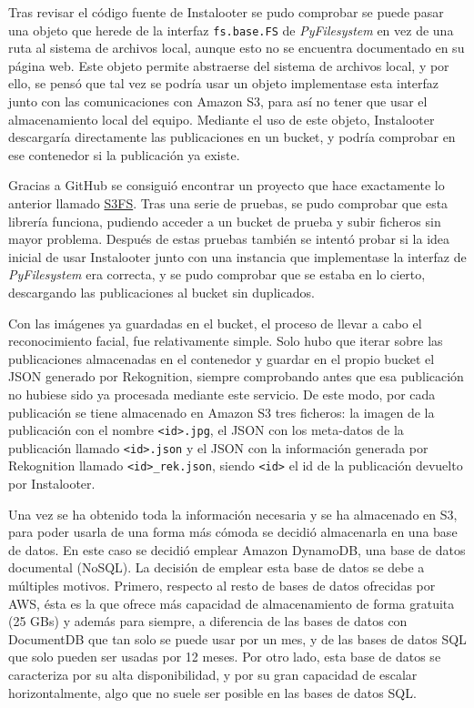 Tras revisar el código fuente de Instalooter se pudo comprobar se puede pasar una objeto que herede de la interfaz \texttt{fs.base.FS} de \textit{PyFilesystem} en vez de una ruta al sistema de archivos local, aunque esto no se encuentra documentado en su página web. Este objeto permite abstraerse del sistema de archivos local, y por ello, se pensó que tal vez se podría usar un objeto implementase esta interfaz junto con las comunicaciones con Amazon S3, para así no tener que usar el almacenamiento local del equipo. Mediante el uso de este objeto, Instalooter descargaría directamente las publicaciones en un bucket, y podría comprobar en ese contenedor si la publicación ya existe.

Gracias a GitHub se consiguió encontrar un proyecto que hace exactamente lo anterior llamado \href{https://github.com/PyFilesystem/s3fs}{S3FS}. Tras una serie de pruebas, se pudo comprobar que esta librería funciona, pudiendo acceder a un bucket de prueba y subir ficheros sin mayor problema. Después de estas pruebas también se intentó probar si la idea inicial de usar Instalooter junto con una instancia que implementase la interfaz de \textit{PyFilesystem} era correcta, y se pudo comprobar que se estaba en lo cierto, descargando las publicaciones al bucket sin duplicados.

Con las imágenes ya guardadas en el bucket, el proceso de llevar a cabo el reconocimiento facial, fue relativamente simple. Solo hubo que iterar sobre las publicaciones almacenadas en el contenedor y guardar en el propio bucket el JSON generado por Rekognition, siempre comprobando antes que esa publicación no hubiese sido ya procesada mediante este servicio. De este modo, por cada publicación se tiene almacenado en Amazon S3 tres ficheros: la imagen de la publicación con el nombre \texttt{<id>.jpg}, el JSON con los meta-datos de la publicación llamado \texttt{<id>.json} y el JSON con la información generada por Rekognition llamado \texttt{<id>\_rek.json}, siendo \texttt{<id>} el id de la publicación devuelto por Instalooter.

Una vez se ha obtenido toda la información necesaria y se ha almacenado en S3, para poder usarla de una forma más cómoda se decidió almacenarla en una base de datos. En este caso se decidió emplear Amazon DynamoDB, una base de datos documental (NoSQL). La decisión de emplear esta base de datos se debe a múltiples motivos. Primero, respecto al resto de bases de datos ofrecidas por AWS, ésta es la que ofrece más capacidad de almacenamiento de forma gratuita (25 GBs) y además para siempre, a diferencia de las bases de datos con DocumentDB que tan solo se puede usar por un mes, y de las bases de datos SQL que solo pueden ser usadas por 12 meses. Por otro lado, esta base de datos se caracteriza por su alta disponibilidad, y por su gran capacidad de escalar horizontalmente, algo que no suele ser posible en las bases de datos SQL.

